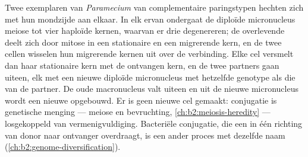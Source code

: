 \begin{proposition}\label{prop:b2:unicellular-diversity:conjugation}
Twee exemplaren van \emph{Paramecium} van complementaire paringstypen
hechten zich met hun mondzijde aan elkaar. In elk ervan ondergaat de
diploïde micronucleus meiose tot vier haploïde kernen, waarvan er drie
degenereren; de overlevende deelt zich door mitose in een stationaire
en een migrerende kern, en de twee cellen wisselen hun migrerende kernen
uit over de verbinding. Elke cel versmelt dan haar stationaire kern met
de ontvangen kern, en de twee partners gaan uiteen, elk met een nieuwe
diploïde micronucleus met hetzelfde genotype als die van de partner. De
oude macronucleus valt uiteen en uit de nieuwe micronucleus wordt een
nieuwe opgebouwd. Er is geen nieuwe cel gemaakt: conjugatie is
genetische menging --- meiose en bevruchting,
\cref{ch:b2:meiosis-heredity} --- losgekoppeld van vermenigvuldiging.
Bacteriële conjugatie, die een  in één richting van donor naar
ontvanger overdraagt, is een ander proces met dezelfde naam
(\cref{ch:b2:genome-diversification}).
\end{proposition}

